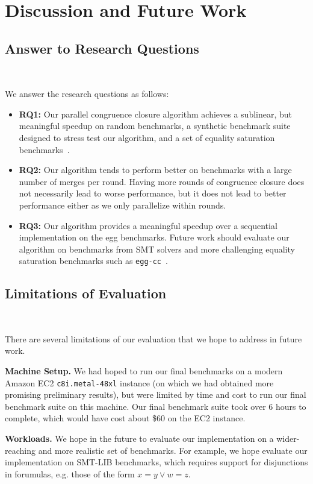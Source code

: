 \section{Discussion and Future Work}
\label{sec:disc}

\subsection{Answer to Research Questions}~\label{sec:disc:rq}

We answer the research questions as follows:

\begin{itemize}
  \item \textbf{RQ1:} Our parallel congruence closure algorithm achieves a
  sublinear, but meaningful speedup on random benchmarks, a synthetic benchmark
  suite designed to stress test our algorithm, and a set of equality saturation
  benchmarks~\cite{eqsat}.
  \item \textbf{RQ2:} Our algorithm tends to perform better on benchmarks with a
  large number of merges per round. Having more rounds of congruence closure
  does not necessarily lead to worse performance, but it does not lead to better
  performance either as we only parallelize within rounds.
  \item \textbf{RQ3:} Our algorithm provides a meaningful speedup over a
  sequential implementation on the egg benchmarks. Future work should evaluate
  our algorithm on benchmarks from SMT solvers and  more challenging equality
  saturation benchmarks such as \texttt{egg-cc}~\cite{eggcc}.
\end{itemize}


\subsection{Limitations of Evaluation}~\label{sec:disc:limit-eval}

There are several limitations of our evaluation that we hope to address in
future work.

\textbf{Machine Setup.} We had hoped to run our final benchmarks on a modern
Amazon EC2 \texttt{c8i.metal-48xl} instance (on which we had obtained more
promising preliminary results), but were limited by time and cost to run our
final benchmark suite on this machine. Our final benchmark suite took over 6
hours to complete, which would have cost about \$60 on the EC2 instance.

\textbf{Workloads.} We hope in the future to evaluate our implementation on a
wider-reaching and more realistic set of benchmarks. For example, we hope
evaluate our implementation on SMT-LIB benchmarks, which requires support for
disjunctions in forumulas, e.g. those of the form $x = y \vee w = z$.

